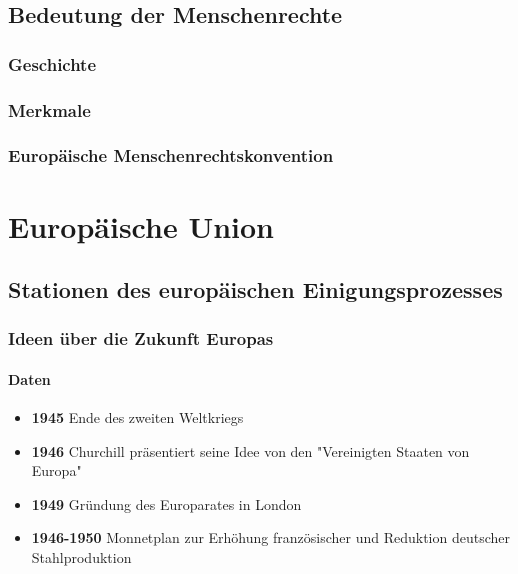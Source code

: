 \documentclass{article}
\begin{document}
	\subsection{Bedeutung der Menschenrechte}

	\subsubsection{Geschichte}

	\subsubsection{Merkmale}

	\subsubsection{Europäische Menschenrechtskonvention}

	\section{Europäische Union}

	\subsection{Stationen des europäischen Einigungsprozesses}
	\subsubsection{Ideen über die Zukunft Europas}
	\paragraph{Daten}
	\begin{itemize}
		\item \textbf{1945} Ende des zweiten Weltkriegs
		\item \textbf{1946} Churchill präsentiert seine Idee von den "Vereinigten Staaten von Europa"
		\item \textbf{1949} Gründung des Europarates in London
		\item \textbf{1946-1950} Monnetplan zur Erhöhung französischer und Reduktion deutscher Stahlproduktion
	\end{itemize}
\end{document}
